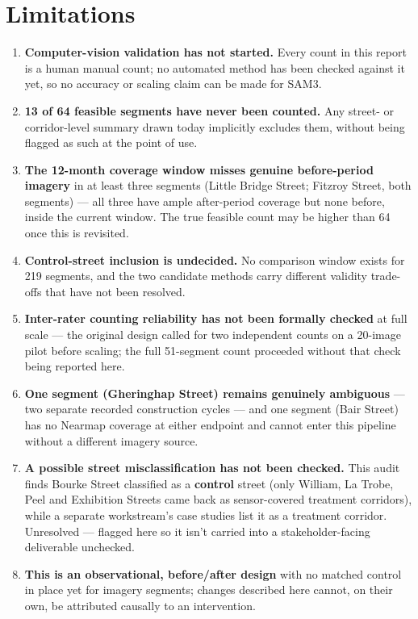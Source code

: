 \documentclass[10pt,conference]{IEEEtran}
\begin{document}
\section{Limitations}
\begin{enumerate}[leftmargin=*]
\item \textbf{Computer-vision validation has not started.} Every count in this report is a human manual count; no automated method has been checked against it yet, so no accuracy or scaling claim can be made for SAM3.
\item \textbf{13 of 64 feasible segments have never been counted.} Any street- or corridor-level summary drawn today implicitly excludes them, without being flagged as such at the point of use.
\item \textbf{The 12-month coverage window misses genuine before-period imagery} in at least three segments (Little Bridge Street; Fitzroy Street, both segments) --- all three have ample after-period coverage but none before, inside the current window. The true feasible count may be higher than 64 once this is revisited.
\item \textbf{Control-street inclusion is undecided.} No comparison window exists for 219 segments, and the two candidate methods carry different validity trade-offs that have not been resolved.
\item \textbf{Inter-rater counting reliability has not been formally checked} at full scale --- the original design called for two independent counts on a 20-image pilot before scaling; the full 51-segment count proceeded without that check being reported here.
\item \textbf{One segment (Gheringhap Street) remains genuinely ambiguous} --- two separate recorded construction cycles --- and one segment (Bair Street) has no Nearmap coverage at either endpoint and cannot enter this pipeline without a different imagery source.
\item \textbf{A possible street misclassification has not been checked.} This audit finds Bourke Street classified as a \textbf{control} street (only William, La Trobe, Peel and Exhibition Streets came back as sensor-covered treatment corridors), while a separate workstream's case studies list it as a treatment corridor. Unresolved --- flagged here so it isn't carried into a stakeholder-facing deliverable unchecked.
\item \textbf{This is an observational, before/after design} with no matched control in place yet for imagery segments; changes described here cannot, on their own, be attributed causally to an intervention.

\end{enumerate}
\end{document}
